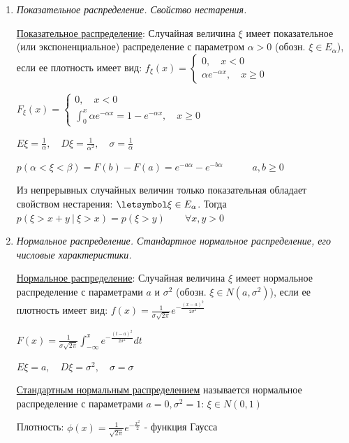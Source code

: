 \documentclass[12pt]{article}
\begin{document}
\begin{enumerate}
    $p(\alpha < \xi < \beta) = \frac{\beta - \alpha}{b - a}$ при условии, что $\alpha, \beta \in [a, b]$

    \item \textit{Показательное распределение. Свойство нестарения.}

    \hyperlink{exponentialdistribution}{Показательное распределение}: Случайная величина $\xi$ имеет показательное (или экспоненциальное) распределение с параметром $\alpha > 0$ (обозн. $\xi \in E_\alpha$),
    если ее плотность имеет вид: $f_\xi(x) = \begin{cases}0, \quad x < 0 \\ \alpha e^{-\alpha x}, \quad x \geq 0\end{cases}$

    $F_\xi(x) = \begin{cases}0, \quad x < 0 \\ \int_0^x \alpha e^{-\alpha x} = 1 - e^{-\alpha x}, \quad x \geq 0\end{cases}$

    $E\xi = \frac{1}{\alpha}, \quad D\xi = \frac{1}{\alpha^2}, \quad \sigma = \frac{1}{\alpha}$

    $p(\alpha < \xi < \beta) = F(b) - F(a) = e^{-a\alpha} - e^{-b\alpha} \quad\quad\quad a, b \geq 0$

    Из непрерывных случайных величин только показательная обладает свойством нестарения:
    \Ths $\letsymbol \xi \in E_\alpha$. Тогда $p(\xi > x + y \ | \ \xi > x) = p(\xi > y) \quad\quad \forall x, y > 0$

    \item \textit{Нормальное распределение. Стандартное нормальное распределение, его числовые характеристики.}

    \hyperlink{normaldistribution}{Нормальное распределение}: Случайная величина $\xi$ имеет нормальное распределение с параметрами $a$ и $\sigma^2$ (обозн. $\xi \in N(a, \sigma^2)$), если
    ее плотность имеет вид: $f(x) = \frac{1}{\sigma \sqrt{2\pi}} e^{-\frac{(x - a)^2}{2\sigma^2}}$

    $F(x) = \frac{1}{\sigma \sqrt{2\pi}} \int_{-\infty}^x e^{-\frac{(t - a)^2}{2\sigma^2}} dt$

    $E\xi = a, \quad D\xi = \sigma^2, \quad \sigma = \sigma$

    \hyperlink{standardnormaldistribution}{Стандартным нормальным распределением} называется нормальное распределение с параметрами $a = 0, \sigma^2 = 1$: $\xi \in N(0, 1)$

    Плотность: $\phi(x) = \frac{1}{\sqrt{2\pi}} e^{-\frac{x^2}{2}}$ - функция Гаусса


\end{enumerate}
\end{document}
